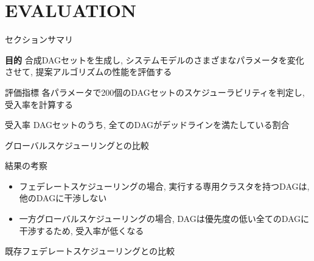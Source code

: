
\section{EVALUATION}
\label{sec: evaluation}

\begin{frame}{セクションサマリ}
    \begin{itembox}[l]{\textbf{目的}}
        合成DAGセットを生成し, システムモデルのさまざまなパラメータを変化させて, 提案アルゴリズムの性能を評価する
    \end{itembox}
\end{frame}

\begin{frame}{評価指標}
    各パラメータで200個のDAGセットのスケジューラビリティを判定し, 受入率を計算する
    \begin{block}{受入率}
        DAGセットのうち, 全てのDAGがデッドラインを満たしている割合
    \end{block}
\end{frame}

\begin{frame}{グローバルスケジューリングとの比較}
\end{frame}

\begin{frame}{結果の考察}
    \begin{itemize}
        \item フェデレートスケジューリングの場合, 実行する専用クラスタを持つDAGは, 他のDAGに干渉しない
        \item 一方グローバルスケジューリングの場合, DAGは優先度の低い全てのDAGに干渉するため, 受入率が低くなる
    \end{itemize}
\end{frame}

\begin{frame}{既存フェデレートスケジューリングとの比較}
\end{frame}
